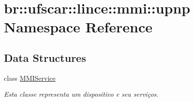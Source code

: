 \hypertarget{namespacebr_1_1ufscar_1_1lince_1_1mmi_1_1upnp}{
\section{br::ufscar::lince::mmi::upnp Namespace Reference}
\label{namespacebr_1_1ufscar_1_1lince_1_1mmi_1_1upnp}
}
\subsection*{Data Structures}
\begin{DoxyCompactItemize}
\item 
class \hyperlink{classbr_1_1ufscar_1_1lince_1_1mmi_1_1upnp_1_1MMIService}{MMIService}
\begin{DoxyCompactList}\small\item\em Esta classe representa um dispositivo e seu serviços. \item\end{DoxyCompactList}\end{DoxyCompactItemize}
